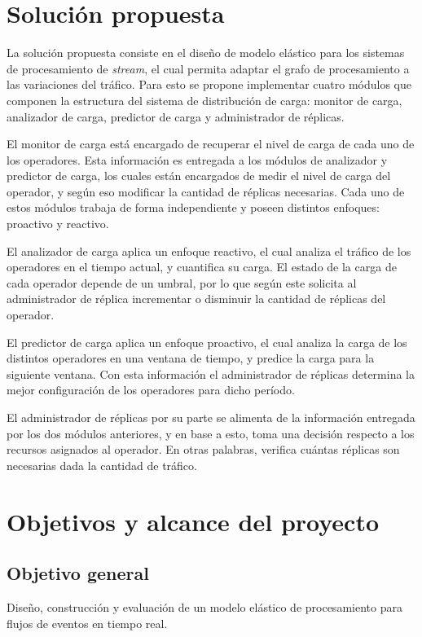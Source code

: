 \section{Solución propuesta}
\label{intro:solucion}

La solución propuesta consiste en el dise\~no de modelo elástico para los sistemas de procesamiento de \textit{stream}, el cual permita adaptar el grafo de procesamiento a las variaciones del tráfico. Para esto se propone implementar cuatro módulos que componen la estructura del sistema de distribución de carga: monitor de carga, analizador de carga, predictor de carga y administrador de réplicas.

El monitor de carga está encargado de recuperar el nivel de carga de cada uno de los operadores. Esta información es entregada a los módulos de analizador y predictor de carga, los cuales están encargados de medir el nivel de carga del operador, y según eso modificar la cantidad de réplicas necesarias. Cada uno de estos módulos trabaja de forma independiente y poseen distintos enfoques: proactivo y reactivo.

El analizador de carga aplica un enfoque reactivo, el cual analiza el tráfico de los operadores en el tiempo actual, y cuantifica su carga. El estado de la carga de cada operador depende de un umbral, por lo que según este solicita al administrador de réplica incrementar o disminuir la cantidad de réplicas del operador.

El predictor de carga aplica un enfoque proactivo, el cual analiza la carga de los distintos operadores en una ventana de tiempo, y predice la carga para la siguiente ventana. Con esta información el administrador de réplicas determina la mejor configuración de los operadores para dicho período.

El administrador de réplicas por su parte se alimenta de la información entregada por los dos módulos anteriores, y en base a esto, toma una decisión respecto a los recursos asignados al operador. En otras palabras, verifica cuántas réplicas son necesarias dada la cantidad de tráfico.

\section{Objetivos y alcance del proyecto}
\label{intro:objetivos}

\subsection{Objetivo general}
	Dise\~no, construcción y evaluaci\'on de un modelo elástico de procesamiento para flujos de eventos en tiempo real.

